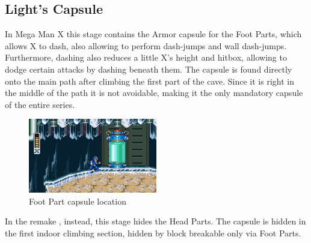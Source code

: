 \subsection{Light's Capsule}\label{X:Foot_Parts}
In Mega Man X this stage contains the Armor capsule for the Foot Parts, which allows X to dash, also allowing to perform dash-jumps and wall dash-jumps. Furthermore, dashing also reduces a little X's height and hitbox, allowing to dodge certain attacks by dashing beneath them. The capsule is found directly onto the main path after climbing the first part of the cave. Since it is right in the middle of the path it is not avoidable, making it the only mandatory capsule of the entire series.
\begin{figure}[htp]
	\centering
	\includegraphics[width=0.5\textwidth]{figures/X1/Chill_penguin/Armor_foot.jpg}
	\caption{Foot Part capsule location}
\end{figure}

In the remake \mhx, instead, this stage hides the Head Parts. The capsule is hidden in the first indoor climbing section, hidden by block breakable only via Foot Parts.

